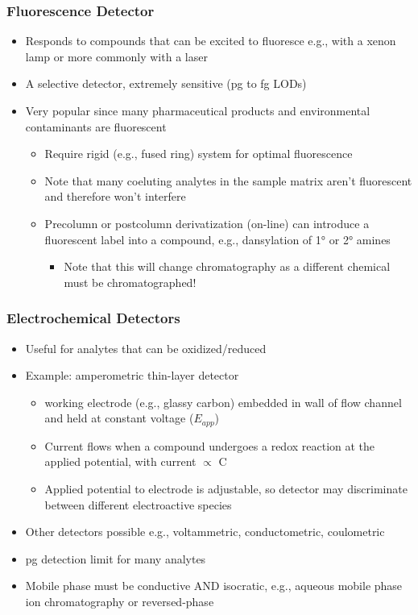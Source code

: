 \documentclass[a4paper, 12pt]{article}
\begin{document}
\subsubsection{Fluorescence Detector}

\begin{itemize}
	\item Responds to compounds that can be excited to fluoresce e.g., with a xenon lamp or more commonly with a laser
	\item A selective detector, extremely sensitive (pg to fg LODs)
	\item Very popular since many pharmaceutical products and environmental contaminants are fluorescent
	\begin{itemize}
		\item Require rigid (e.g., fused ring) system for optimal fluorescence
		\item Note that many coeluting analytes in the sample matrix aren’t fluorescent and therefore won’t interfere
		\item Precolumn or postcolumn derivatization (on-line) can introduce a fluorescent label into a compound, e.g., dansylation of \ang{1} or \ang{2} amines
		\begin{itemize}
			\item Note that this will change chromatography as a different chemical must be chromatographed!
		\end{itemize}
	\end{itemize}
\end{itemize}

\subsubsection{Electrochemical Detectors}

\begin{itemize}
	\item Useful for analytes that can be oxidized/reduced
	\item Example: amperometric thin-layer detector
	\begin{itemize}
		\item working electrode (e.g., glassy carbon) embedded in wall of flow channel and held at constant voltage ($E_{app}$)
		\item Current flows when a compound undergoes a redox reaction at the applied potential, with current $\propto$ C
		\item Applied potential to electrode is adjustable, so detector may discriminate between different electroactive species
	\end{itemize}
	\item Other detectors possible e.g., voltammetric, conductometric, coulometric
	\item pg detection limit for many analytes
	\item Mobile phase must be conductive AND isocratic, e.g., aqueous mobile phase ion chromatography or reversed-phase
\end{itemize}
\end{document}
